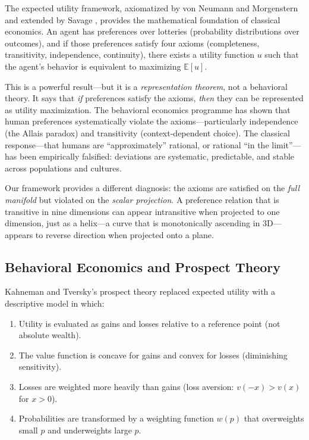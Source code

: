 \documentclass[12pt]{article}
\theoremstyle{definition}
\theoremstyle{remark}
\begin{document}
The expected utility framework, axiomatized by von Neumann and Morgenstern \cite{vonneumann1944} and extended by Savage \cite{savage1954}, provides the mathematical foundation of classical economics.  An agent has preferences over lotteries (probability distributions over outcomes), and if those preferences satisfy four axioms (completeness, transitivity, independence, continuity), there exists a utility function $u$ such that the agent's behavior is equivalent to maximizing $\mathbb{E}[u]$.

This is a powerful result---but it is a \emph{representation theorem}, not a behavioral theory.  It says that \emph{if} preferences satisfy the axioms, \emph{then} they can be represented as utility maximization.  The behavioral economics programme has shown that human preferences systematically violate the axioms---particularly independence (the Allais paradox) and transitivity (context-dependent choice).  The classical response---that humans are ``approximately'' rational, or rational ``in the limit''---has been empirically falsified: deviations are systematic, predictable, and stable across populations and cultures.

Our framework provides a different diagnosis: the axioms are satisfied on the \emph{full manifold} but violated on the \emph{scalar projection}.  A preference relation that is transitive in nine dimensions can appear intransitive when projected to one dimension, just as a helix---a curve that is monotonically ascending in 3D---appears to reverse direction when projected onto a plane.

\subsection{Behavioral Economics and Prospect Theory}

Kahneman and Tversky's prospect theory \cite{kahneman1979} replaced expected utility with a descriptive model in which:
\begin{enumerate}
    \item Utility is evaluated as gains and losses relative to a reference point (not absolute wealth).
    \item The value function is concave for gains and convex for losses (diminishing sensitivity).
    \item Losses are weighted more heavily than gains (loss aversion: $v(-x) > v(x)$ for $x > 0$).
    \item Probabilities are transformed by a weighting function $w(p)$ that overweights small $p$ and underweights large $p$.
\end{enumerate}
\end{document}
